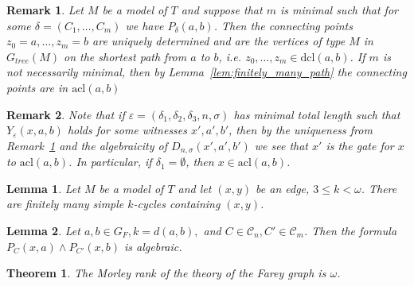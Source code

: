 \documentclass[10pt,a4paper]{amsart}
\newtheorem{lemma}{Lemma}
\newtheorem{remark}{Remark}
\newtheorem{theorem}{Theorem}
\newcommand{\C}{\mathcal{C}}
\newcommand{\acl}{\mathrm{acl}}
\renewcommand{\d}{\delta}
\newcommand{\dcl}{\mathrm{dcl}}
\renewcommand{\epsilon}{\varepsilon}
\begin{document}
\begin{remark}\label{rem:unique connecting points}
Let $M$ be a model of $T$ and suppose that $m$ is minimal such that for some $\delta=(C_1,\ldots, C_m)$ we have $P_\d(a,b)$. Then the connecting points $z_0=a,\ldots, z_m=b$ are uniquely determined and are the vertices of type $M$ in $G_{tree}(M)$ on the shortest path from $a$  to $b$, i.e. $z_0,\ldots, z_m\in\dcl(a,b)$.
If $m$ is not necessarily minimal, then by Lemma~\ref{lem:finitely_many_path} the connecting points are in $\acl(a,b)$
\end{remark}

\begin{remark}\label{rem:Y algebraic}
Note that if $\epsilon=(\d_1,\d_2,\d_3,n,\sigma)$ has minimal total length such that $Y_\epsilon(x,a,b)$ holds for some witnesses $x',a',b'$, then by the uniqueness from Remark~\ref{rem:unique connecting points} and the algebraicity of $D_{n,\sigma}(x',a',b')$  we see that $x'$ is the gate for $x$ to $\acl(a,b)$.
In particular, if $\d_1=\emptyset$, then $x\in\acl(a,b)$.
 
\end{remark}

\begin{lemma}\label{lem:finitely many cycles}
Let $M$ be a model of $T$ and let $(x,y)$ be an edge, $3\leq k<\omega$. There are finitely many simple $k$-cycles  containing $(x,y)$.
\end{lemma}

\begin{lemma}\label{lem:str min}
Let $a,b\in G_F, k=d(a,b),$ and $C\in \C_n, C'\in\C_m$. Then the formula $P_C(x,a)\wedge P_{C'}(x,b)$ is algebraic.
\end{lemma}

 \begin{theorem}\label{thm:omega}
     The Morley rank of the theory of the Farey graph is $\omega$.
 \end{theorem}
\end{document}
